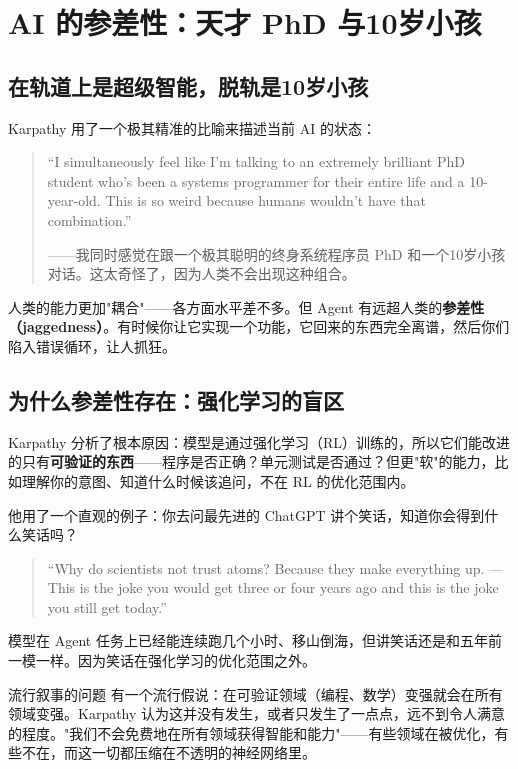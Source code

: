 \section{AI 的参差性：天才 PhD 与10岁小孩}

\subsection{在轨道上是超级智能，脱轨是10岁小孩}

Karpathy 用了一个极其精准的比喻来描述当前 AI 的状态：

\begin{quote}
``I simultaneously feel like I'm talking to an extremely brilliant PhD student who's been a systems programmer for their entire life and a 10-year-old. This is so weird because humans wouldn't have that combination.''

——我同时感觉在跟一个极其聪明的终身系统程序员 PhD 和一个10岁小孩对话。这太奇怪了，因为人类不会出现这种组合。
\end{quote}

人类的能力更加"耦合"——各方面水平差不多。但 Agent 有远超人类的\textbf{参差性（jaggedness）}。有时候你让它实现一个功能，它回来的东西完全离谱，然后你们陷入错误循环，让人抓狂。

\subsection{为什么参差性存在：强化学习的盲区}

Karpathy 分析了根本原因：模型是通过强化学习（RL）训练的，所以它们能改进的只有\textbf{可验证的东西}——程序是否正确？单元测试是否通过？但更"软"的能力，比如理解你的意图、知道什么时候该追问，不在 RL 的优化范围内。

他用了一个直观的例子：你去问最先进的 ChatGPT 讲个笑话，知道你会得到什么笑话吗？

\begin{quote}
``Why do scientists not trust atoms? Because they make everything up. — This is the joke you would get three or four years ago and this is the joke you still get today.''
\end{quote}

模型在 Agent 任务上已经能连续跑几个小时、移山倒海，但讲笑话还是和五年前一模一样。因为笑话在强化学习的优化范围之外。

\begin{warningbox}{流行叙事的问题}
有一个流行假说：在可验证领域（编程、数学）变强就会在所有领域变强。Karpathy 认为这并没有发生，或者只发生了一点点，远不到令人满意的程度。"我们不会免费地在所有领域获得智能和能力"——有些领域在被优化，有些不在，而这一切都压缩在不透明的神经网络里。
\end{warningbox}

